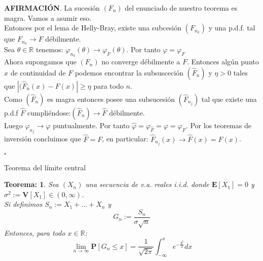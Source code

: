 \documentclass{beamer}
\newcommand{\R}{\mathbb{R}}
\newcommand{\vp}{\varphi}
\newcommand{\E}{\mathbf{E}}
\newcommand{\V}{\mathbf{V}}
\newcommand{\pro}{\mathbf{P}}
\newtheorem{teo}{Teorema:}
\begin{document}
\begin{frame}
	\textbf{AFIRMACIÓN}. La sucesión $(F_{n})$ del enunciado de nuestro teorema es magra. Vamos a asumir eso.\\
	
	Entonces por el lema de Helly-Bray, existe una subcesión $(F_{n_{k}})$ y una p.d.f. tal que $F_{n_{k}} \longrightarrow F  $ débilmente. \\
	Sea $\theta \in \R$ tenemos: $ \vp_{n_{k}} (\theta) \longrightarrow \vp_{F} (\theta)   $. Por tanto $\vp= \vp_{F}$\\
	
	Ahora supongamos que $(F_{n})$ no converge débilmente a $F$. Entonces algún punto $x$ de continuidad de $F$ podemos encontrar la subsusceción $(\hat{F}_{n})  $ y $\eta >0$ tales que $ |(\hat{F}_{n} (x) - F(x)  | \geq \eta $ para todo $n$. \\
	
	Como $(\hat{F}_{n})  $ es magra entonces posee una subsucesión $(\hat{F}_{n_{j}})  $ tal que existe una p.d.f $\hat{F}  $ cumpliéndose:$(\hat{F}_{n}) \longrightarrow \hat{F}   $ débilmente. \\
	
	Luego $\hat{\vp}_{n_{j}} \longrightarrow \hat{\vp} $ puntualmente. Por tanto $ \hat{\vp} = \varphi _{\hat{F}}= \vp = \vp_{F} $. Por los teoremas de inversión concluimos que $ \hat{F}=F $, en particular: $\hat{F}_{n_{j}} (x) \longrightarrow \hat{F} (x) = F(x)  $.
	\begin{flushright}
		$ \square $
	\end{flushright}
\end{frame}


\begin{frame}{Teorema del límite central}
	\begin{teo}
		Sea $(X_{n})$ una secuencia de v.a. reales i.i.d. donde $  \E[X_{1}] =0 $ y $\sigma^{2}:= \V[X_{1}] \in (0, \infty) $.\\ 
		Si definimos $S_{n} := X_{1}+ \ldots + X_{n}$ y $$ G_{n} := \frac{S_{n}}{\sigma \sqrt{n}}  $$
		Entonces, para todo $x \in \R$:
		$$ \lim\limits_{n \rightarrow \infty} \pro [G_{n}  \leq x] = \frac{1}{\sqrt{2\pi}} \int_{-\infty}^{x} e^{-\frac{y^{2}}{2}} dx  $$
	\end{teo}
\end{frame}
\end{document}
